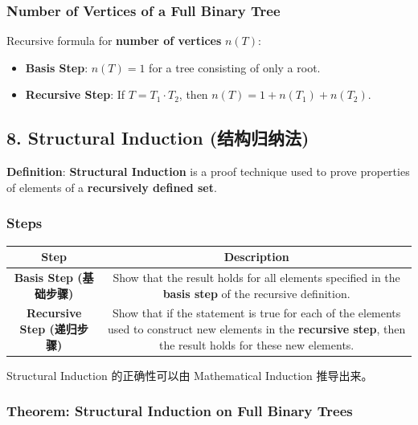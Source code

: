 \documentclass[10pt,a4paper,openany]{ctexbook}
\theoremstyle{definition}
\theoremstyle{remark}
\renewenvironment{quote}
  {\list{}{\leftmargin=1em\rightmargin=0pt\topsep=0.5pt\partopsep=0pt}\item[]}
  {\endlist}
\begin{document}
\subsubsection{Number of Vertices of a Full Binary Tree}

Recursive formula for \textbf{number of vertices} $n(T)$:
\begin{itemize}
\item \textbf{Basis Step}: $n(T) = 1$ for a tree consisting of only a root.
\item \textbf{Recursive Step}: If $T = T_1 \cdot T_2$, then $n(T) = 1 + n(T_1) + n(T_2)$.

\end{itemize}

\vspace{-2pt}

\subsection{8. Structural Induction (结构归纳法)}

\textbf{Definition}: \textbf{Structural Induction} is a proof technique used to prove properties of elements of a \textbf{recursively defined set}.
\subsubsection{Steps}

\begin{center}
\begin{tabular}{cc}
\hline
Step & Description \\ \hline
\textbf{Basis Step (基础步骤)} & Show that the result holds for all elements specified in the \textbf{basis step} of the recursive definition. \\
\textbf{Recursive Step (递归步骤)} & Show that if the statement is true for each of the elements used to construct new elements in the \textbf{recursive step}, then the result holds for these new elements. \\
\hline
\end{tabular}

\end{center}

\begin{quote}
Structural Induction 的正确性可以由 Mathematical Induction 推导出来。

\end{quote}

\subsubsection{Theorem: Structural Induction on Full Binary Trees}
\end{document}
